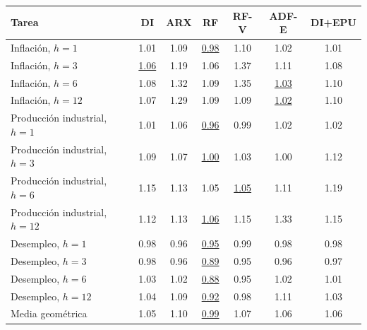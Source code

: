 \begin{tabularx}{\textwidth}{X *{6}{c}}
\toprule
Tarea & DI & ARX & RF & RF-V & ADF-E & DI+EPU \\
\midrule
Inflación, $h=1$ & 1.01 & 1.09 & \underline{0.98} & 1.10 & 1.02 & 1.01 \\
Inflación, $h=3$ & \underline{1.06} & 1.19 & 1.06 & 1.37 & 1.11 & 1.08 \\
Inflación, $h=6$ & 1.08 & 1.32 & 1.09 & 1.35 & \underline{1.03} & 1.10 \\
Inflación, $h=12$ & 1.07 & 1.29 & 1.09 & 1.09 & \underline{1.02} & 1.10 \\
Producción industrial, $h=1$ & 1.01 & 1.06 & \underline{0.96} & 0.99 & 1.02 & 1.02 \\
Producción industrial, $h=3$ & 1.09 & 1.07 & \underline{1.00} & 1.03 & 1.00 & 1.12 \\
Producción industrial, $h=6$ & 1.15 & 1.13 & 1.05 & \underline{1.05} & 1.11 & 1.19 \\
Producción industrial, $h=12$ & 1.12 & 1.13 & \underline{1.06} & 1.15 & 1.33 & 1.15 \\
Desempleo, $h=1$ & 0.98 & 0.96 & \underline{0.95} & 0.99 & 0.98 & 0.98 \\
Desempleo, $h=3$ & 0.98 & 0.96 & \underline{0.89} & 0.95 & 0.96 & 0.97 \\
Desempleo, $h=6$ & 1.03 & 1.02 & \underline{0.88} & 0.95 & 1.02 & 1.01 \\
Desempleo, $h=12$ & 1.04 & 1.09 & \underline{0.92} & 0.98 & 1.11 & 1.03 \\
\midrule Media geométrica & 1.05 & 1.10 & \underline{0.99} & 1.07 & 1.06 & 1.06 \\
\bottomrule
\end{tabularx}
